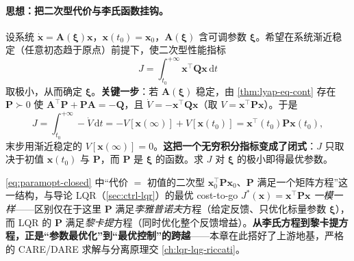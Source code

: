 \paragraph{思想：把二次型代价与李氏函数挂钩。}
设系统 $\dot{\mathbf{x}}=\mathbf{A}(\boldsymbol\xi)\mathbf{x}$，$\mathbf{x}(t_0)=\mathbf{x}_0$，$\mathbf{A}(\boldsymbol\xi)$ 含可调参数 $\boldsymbol\xi$。希望在系统渐近稳定（任意初态趋于原点）前提下，使二次型性能指标
\begin{equation}
  J=\int_{t_0}^{+\infty}\mathbf{x}^\top\mathbf{Q}\mathbf{x}\,\mathrm dt
  \label{eq:paramopt-J}
\end{equation}
取极小，从而确定 $\boldsymbol\xi$。\textbf{关键一步}：若 $\mathbf{A}(\boldsymbol\xi)$ 稳定，由 \cref{thm:lyap-eq-cont} 存在 $\mathbf{P}\succ0$ 使 $\mathbf{A}^\top\mathbf{P}+\mathbf{P}\mathbf{A}=-\mathbf{Q}$，且 $\dot V=-\mathbf{x}^\top\mathbf{Q}\mathbf{x}$（取 $V=\mathbf{x}^\top\mathbf{P}\mathbf{x}$）。于是
\begin{equation}
  J=\int_{t_0}^{+\infty}\!\!-\dot V\,\mathrm dt=-V[\mathbf{x}(\infty)]+V[\mathbf{x}(t_0)]=\mathbf{x}^\top(t_0)\mathbf{P}\mathbf{x}(t_0),
  \label{eq:paramopt-closed}
\end{equation}
末步用渐近稳定的 $V[\mathbf{x}(\infty)]=0$。\textbf{这把一个无穷积分指标变成了闭式}：$J$ 只取决于初值 $\mathbf{x}(t_0)$ 与 $\mathbf{P}$，而 $\mathbf{P}$ 是 $\boldsymbol\xi$ 的函数。求 $J$ 对 $\boldsymbol\xi$ 的极小即得最优参数。

\begin{insight}
\cref{eq:paramopt-closed} 中“代价 $=$ 初值的二次型 $\mathbf{x}_0^\top\mathbf{P}\mathbf{x}_0$、$\mathbf{P}$ 满足一个矩阵方程”这一结构，与导论 LQR（\cref{sec:ctrl-lqr}）的最优 cost-to-go $J^*(\mathbf{x})=\mathbf{x}^\top\mathbf{P}\mathbf{x}$ \emph{一模一样}——区别仅在于这里 $\mathbf{P}$ 满足\emph{李雅普诺夫}方程（给定反馈、只优化标量参数 $\boldsymbol\xi$），而 LQR 的 $\mathbf{P}$ 满足\emph{黎卡提}方程（同时优化整个反馈增益）。\textbf{从李氏方程到黎卡提方程，正是“参数最优化”到“最优控制”的跨越}——本章在此搭好了上游地基，严格的 CARE/DARE 求解与分离原理交 \cref{ch:lqr-lqg-riccati}。
\end{insight}

